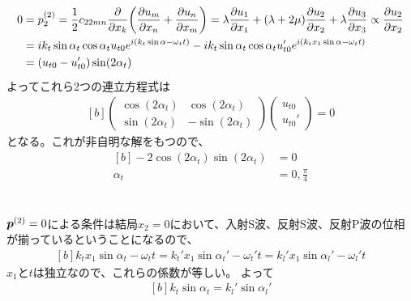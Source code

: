 \documentclass[../ap_2021.tex]{subfiles}
\begin{document}
\section{}
\begin{equation}\begin{aligned}[b]
    0 &= p_2^{(2)} =
    \frac{1}{2}c_{22mn}\pdv{x_k}\qty(\pdv{u_m}{x_n}+\pdv{u_n}{x_m})
    =\lambda\pdv{u_1}{x_1}+(\lambda+2\mu)\pdv{u_2}{x_2}+\lambda\pdv{u_3}{x_3}
    \propto \pdv{u_2}{x_2}\\
    &= ik_t\sin\alpha_t \cos\alpha_t u_{t0}e^{i(k_t\sin\alpha-\omega_tt)}-ik_t\sin \alpha_t\cos\alpha_t u_{t0}'e^{i(k_tx_1\sin\alpha-\omega_tt)}\\
    &=(u_{t0}-u_{t0}')\sin(2\alpha_t)
\end{aligned}\end{equation}
よってこれら2つの連立方程式は
\begin{equation}\begin{aligned}[b]
    \begin{pmatrix}
        \cos(2\alpha_t) & \cos(2\alpha_t)\\
        \sin(2\alpha_t) & -\sin(2\alpha_t)
    \end{pmatrix}\begin{pmatrix}
        u_{t0} \\
        u_{t0}'
    \end{pmatrix}
    =0
\end{aligned}\end{equation}
となる。これが非自明な解をもつので、
\begin{equation}\begin{aligned}[b]
    -2\cos(2\alpha_t)\sin(2\alpha_t)&=0\\
    \alpha_t &= 0, \frac{\pi}{4}
\end{aligned}\end{equation}

\section{}
\(\vb*{p}^{(2)}=0\)による条件は結局\(x_2=0\)において、入射S波、反射S波、反射P波の位相が揃っているということになるので、
\begin{equation}\begin{aligned}[b]
    k_tx_1\sin\alpha_t-\omega_tt=k_t'x_1\sin\alpha_t'-\omega_t't=k_l'x_1\sin\alpha_l'-\omega_l't
\end{aligned}\end{equation}
\(x_1\)と\(t\)は独立なので、これらの係数が等しい。
よって
\begin{equation}\begin{aligned}[b]
    k_t\sin\alpha_t = k_l'\sin\alpha_l'
\end{aligned}\end{equation}
\end{document}
